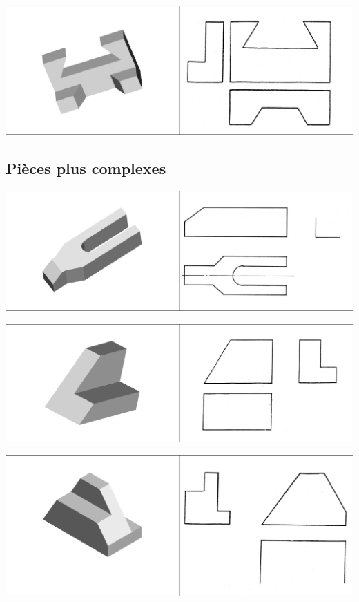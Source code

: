 \documentclass[11pt,oneside]{article}
\begin{document}
\begin{center}
\includegraphics[width=.9\textwidth]{png/fig5}
\end{center}

\subsection{Pièces plus complexes}
\begin{center}
\includegraphics[width=.9\textwidth]{png/fig6}
\end{center}

\begin{center}
\includegraphics[width=.9\textwidth]{png/fig7}
\end{center}

\begin{center}
\includegraphics[width=.9\textwidth]{png/fig8}
\end{center}
\end{document}
